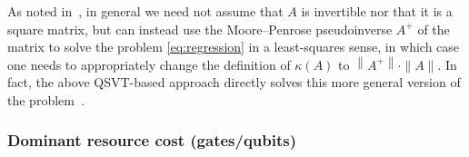 \begin{refsection}
As noted in~\cite{wiebe2012QDataFitting,chakraborty2018BlockMatrixPowers}, in general we need not assume that $A$ is invertible nor that it is a square matrix, but can instead use the Moore--Penrose pseudoinverse $A^+$ of the matrix to solve the problem \eqref{eq:regression} in a least-squares sense, in which case one needs to appropriately change the definition of $\kappa(A)$ to $\left\|A^{+}\right\|\cdot\|A\|$.  In fact, the above QSVT-based approach directly solves this more general version of the problem~\cite{gilyen2018QSingValTransf}. 


\subsubsection*{Dominant resource cost (gates/qubits)}


\end{refsection}
